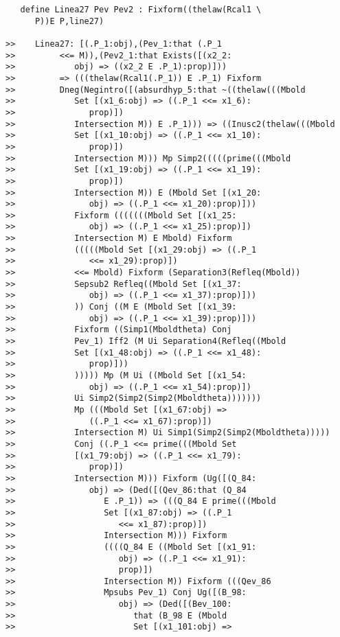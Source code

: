 \documentclass[12pt]{article}
\begin{document}
\begin{verbatim}
   define Linea27 Pev Pev2 : Fixform((thelaw(Rcal1 \
      P))E P,line27)

>>    Linea27: [(.P_1:obj),(Pev_1:that (.P_1
>>         <<= M)),(Pev2_1:that Exists([(x2_2:
>>            obj) => ((x2_2 E .P_1):prop)]))
>>         => (((thelaw(Rcal1(.P_1)) E .P_1) Fixform
>>         Dneg(Negintro([(absurdhyp_5:that ~((thelaw(((Mbold
>>            Set [(x1_6:obj) => ((.P_1 <<= x1_6):
>>               prop)])
>>            Intersection M)) E .P_1))) => ((Inusc2(thelaw(((Mbold
>>            Set [(x1_10:obj) => ((.P_1 <<= x1_10):
>>               prop)])
>>            Intersection M))) Mp Simp2(((((prime(((Mbold
>>            Set [(x1_19:obj) => ((.P_1 <<= x1_19):
>>               prop)])
>>            Intersection M)) E (Mbold Set [(x1_20:
>>               obj) => ((.P_1 <<= x1_20):prop)]))
>>            Fixform (((((((Mbold Set [(x1_25:
>>               obj) => ((.P_1 <<= x1_25):prop)])
>>            Intersection M) E Mbold) Fixform
>>            (((((Mbold Set [(x1_29:obj) => ((.P_1
>>               <<= x1_29):prop)])
>>            <<= Mbold) Fixform (Separation3(Refleq(Mbold))
>>            Sepsub2 Refleq((Mbold Set [(x1_37:
>>               obj) => ((.P_1 <<= x1_37):prop)]))
>>            )) Conj ((M E (Mbold Set [(x1_39:
>>               obj) => ((.P_1 <<= x1_39):prop)]))
>>            Fixform ((Simp1(Mboldtheta) Conj
>>            Pev_1) Iff2 (M Ui Separation4(Refleq((Mbold
>>            Set [(x1_48:obj) => ((.P_1 <<= x1_48):
>>               prop)]))
>>            ))))) Mp (M Ui ((Mbold Set [(x1_54:
>>               obj) => ((.P_1 <<= x1_54):prop)])
>>            Ui Simp2(Simp2(Simp2(Mboldtheta)))))))
>>            Mp (((Mbold Set [(x1_67:obj) =>
>>               ((.P_1 <<= x1_67):prop)])
>>            Intersection M) Ui Simp1(Simp2(Simp2(Mboldtheta)))))
>>            Conj ((.P_1 <<= prime(((Mbold Set
>>            [(x1_79:obj) => ((.P_1 <<= x1_79):
>>               prop)])
>>            Intersection M))) Fixform (Ug([(Q_84:
>>               obj) => (Ded([(Qev_86:that (Q_84
>>                  E .P_1)) => (((Q_84 E prime(((Mbold
>>                  Set [(x1_87:obj) => ((.P_1
>>                     <<= x1_87):prop)])
>>                  Intersection M))) Fixform
>>                  ((((Q_84 E ((Mbold Set [(x1_91:
>>                     obj) => ((.P_1 <<= x1_91):
>>                     prop)])
>>                  Intersection M)) Fixform (((Qev_86
>>                  Mpsubs Pev_1) Conj Ug([(B_98:
>>                     obj) => (Ded([(Bev_100:
>>                        that (B_98 E (Mbold
>>                        Set [(x1_101:obj) =>

\end{verbatim}
\end{document}
